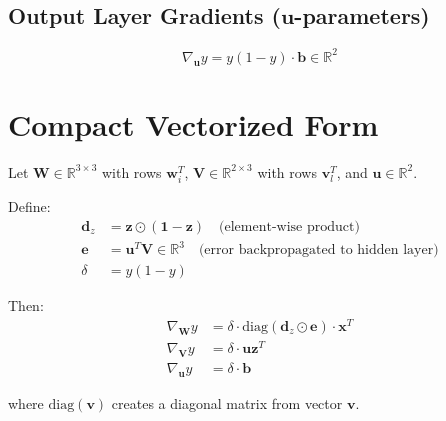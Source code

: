 \documentclass{tufte-handout}
\begin{document}
\subsection*{Output Layer Gradients ($\bm{u}$-parameters)}
\[
\nabla_{\bm{u}} y = y(1-y) \cdot \bm{b} \in \mathbb{R}^2
\]

\section*{Compact Vectorized Form}

Let $\bm{W} \in \mathbb{R}^{3 \times 3}$ with rows $\bm{w}_i^T$, $\bm{V} \in \mathbb{R}^{2 \times 3}$ with rows $\bm{v}_l^T$, and $\bm{u} \in \mathbb{R}^2$.

Define:
\begin{align*}
\bm{d}_z &= \bm{z} \odot (\bm{1} - \bm{z}) \quad \text{(element-wise product)} \\
\bm{e} &= \bm{u}^T \bm{V} \in \mathbb{R}^{3} \quad \text{(error backpropagated to hidden layer)} \\
\delta &= y(1-y)
\end{align*}

Then:
\begin{align*}
\nabla_{\bm{W}} y &= \delta \cdot \text{diag}(\bm{d}_z \odot \bm{e}) \cdot \bm{x}^T \\
\nabla_{\bm{V}} y &= \delta \cdot \bm{u} \bm{z}^T \\
\nabla_{\bm{u}} y &= \delta \cdot \bm{b}
\end{align*}

where $\text{diag}(\bm{v})$ creates a diagonal matrix from vector $\bm{v}$.

\vspace{1cm}
\end{document}
